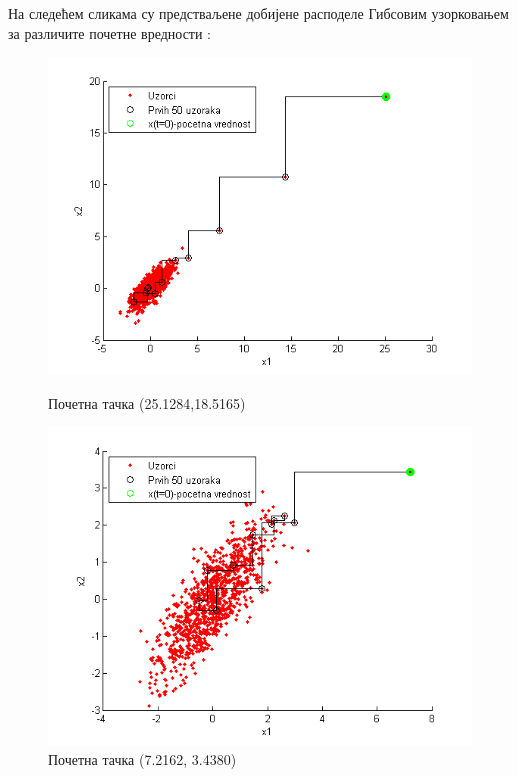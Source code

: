 На следећем сликама су предстваљене добијене расподеле Гибсовим узорковањем за различите почетне вредности :


\begin{figure}[H]
  \includegraphics[scale=0.4]{./Slike/slika22.png} 
  \caption{Почетна тачка (25.1284,18.5165)}\label{fig:slika22}
\endminipage\hfill
{}
  \includegraphics[scale=0.4]{./Slike/slika23.png} 
  \caption{Почетна тачка (7.2162, 3.4380)}\label{fig:slika23}
\endminipage\hfill
{}%

\end{figure}
